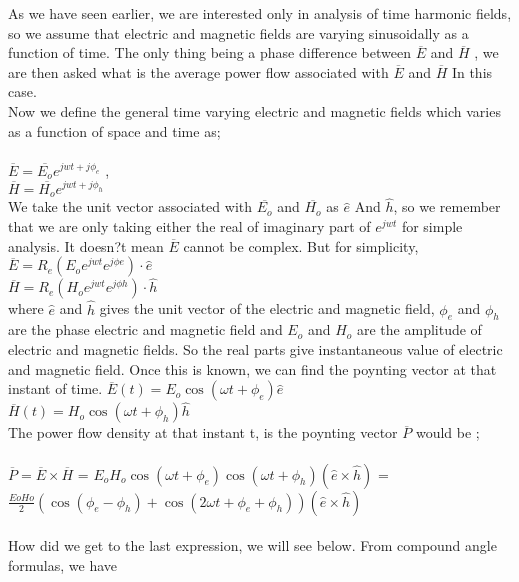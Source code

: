 As we have seen earlier, we are interested only in analysis of time harmonic fields, so we assume that electric and magnetic fields are varying sinusoidally as a function of time. The only thing being a phase difference between $ \overline{E} $ and  $ \overline{H} $ , we are then asked what is the average power flow associated with $ \overline{E} $ and  $ \overline{H} $ In this case.\\


Now we define the general time varying electric and magnetic fields which varies as a function of space and time as;\\
\\
$ \overline{E}=\overline{E_{o}} e^{jwt+j\phi_{e}}$ ,\\
$ \overline{H}=\overline{H_{o}} e^{jwt+j\phi_{h}}$\\
We take the unit vector associated with $ \overline{E_{o}} $ and  $ \overline{H_{o}} $ as $ \hat{e} $ And $ \hat{h} $, so we remember that we are only taking either the real of imaginary part of $ e^{jwt} $ for simple analysis. It doesn?t mean $ \overline{E} $ cannot be complex. But for simplicity,\\
$ \overline{E}=R_{e}(E_{o}e^{jwt}e^{j\phi e} )\cdot\hat{e} $   \\
$ \overline{H}=R_{e}(H_{o}e^{jwt}e^{j\phi h} )\cdot\hat{h} $ \\
where  $ \hat{e} $ and $ \hat{h} $ 
gives the unit vector of the electric and magnetic field, $ \phi_{e} $ and $ \phi_{h} $ are the phase electric and magnetic field and $ E_{o} $ and  $ H_{o} $ are the amplitude of electric  and magnetic fields. So the real parts give instantaneous value of electric and magnetic field. Once this is known, we can find the poynting vector at that instant of time.
$ \overline{E}(t)=E_{o}\cos(\omega t+\phi_{e})\hat{e} $ \\
$ \overline{H}(t)=H_{o}\cos(\omega t+\phi_{h})\hat{h} $\\
The power flow density at that instant t, is the poynting vector  $ \overline{P} $  would be ;\\\\
$ \overline{P}=\overline{E}\times\overline{H} $ = $ E_{o}H_{o}\cos(\omega t+\phi_{e}) \cos(\omega t+\phi_{h}) (\hat{e}\times\hat{h})$ = $ \frac{ E {o}H {o}}{2} (\cos(\phi_{e}-\phi_{h})+\cos(2\omega t + \phi_{e}+\phi_{h}))  (\hat{e}\times\hat{h})$ 
\\\\
		How did we get to the last expression, we will see below.
		From compound angle formulas, we have\\\\
